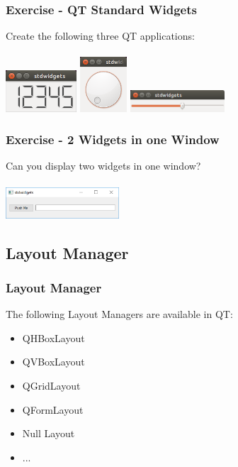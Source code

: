 \begin{frame}[fragile]
\frametitle{Exercise - QT Standard Widgets}
\begin{exercise}
Create the following three QT applications:\\
\vspace{5mm}
\\
\includegraphics[width=75pt]{code/qt/stdwidgets/w1.png}
\hspace{5mm}
\includegraphics[width=50pt]{code/qt/stdwidgets/w2.png}
\hspace{5mm}
\includegraphics[width=100pt]{code/qt/stdwidgets/w3.png}
\end{exercise}
\end{frame}

\begin{frame}[fragile]
\frametitle{Exercise - 2 Widgets in one Window}
\begin{exercise}
Can you display two widgets in one window?\\
\vspace{5mm}
\\
\includegraphics[width=120pt]{code/qt/stdwidgets/w4.png}
\end{exercise}
\end{frame}


\subsection{Layout Manager}
\frame
{
\frametitle{Layout Manager}
The following Layout Managers are available in QT:
\begin{itemize}
\item QHBoxLayout
\item QVBoxLayout
\item QGridLayout
\item QFormLayout
\item Null Layout
\item ...
\end{itemize}
}

